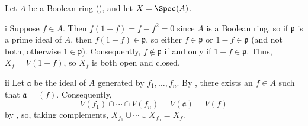 \begin{exercise}
Let \(A\) be a Boolean ring (), and let \(X = \Spec(A)\).
\end{exercise}

\begin{partsolution}{i}
Suppose \(f \in A\).
Then \(f(1 - f) = f - f^2 = 0\) since \(A\) is a Boolean ring, so if \(\mathfrak{p}\) is a prime ideal of \(A\), then \(f(1 - f) \in \mathfrak{p}\), so either \(f \in \mathfrak{p}\) or \(1 - f \in \mathfrak{p}\) (and not both, otherwise \(1 \in \mathfrak{p}\)).
Consequently, \(f \notin \mathfrak{p}\) if and only if \(1 - f \in \mathfrak{p}\).
Thus, \(X_f = V(1 - f)\), so \(X_f\) is both open and closed.
\end{partsolution}

\begin{partsolution}{ii}
Let \(\mathfrak{a}\) be the ideal of \(A\) generated by \(f_1, \ldots, f_n\).
By , there exists an \(f \in A\) such that \(\mathfrak{a} = (f)\).
Consequently,
\begin{equation*}
V(f_1) \cap \cdots \cap V(f_n)
= V(\mathfrak{a})
= V(f)
\end{equation*}
by , so, taking complements, \(X_{f_1} \cup \cdots \cup X_{f_n} = X_f\).
\end{partsolution}

